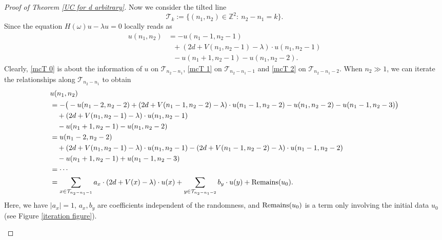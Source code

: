 \documentclass[11pt,reqno,UTF8,twoside]{amsart}
\newcommand{\Z}{\mathbb{Z}}
\newcommand{\mcT}{\mathcal{T}}
\theoremstyle{definition}
\numberwithin{equation}{section}
\begin{document}
\begin{proof}[Proof of Theorem \ref{UC for d arbitrary}]
Now we consider the tilted line 
\[\mcT_k:=  \{(n_1,n_2)\in \Z^2 : \ n_2-n_1  = k \}.\]
Since the  equation $H(\omega) u-\lambda u=0 $ locally reads  as 
\begin{align}
\label{mcT 0}  u(n_1,n_2) &= -u(n_1-1,n_2-1)\\
 \label{mcT 1}   &\ \ \ + (2d+V(n_1,n_2-1)-\lambda)\cdot u(n_1,n_2-1) \\
  \label{mcT 2}  &\ \ \ -u(n_1+1,n_2-1)-u(n_1,n_2-2).
\end{align}
Clearly, \eqref{mcT 0} is about the information of $u$ on $\mcT_{n_2-n_1}$,  \eqref{mcT 1} on $\mcT_{n_2-n_1-1}$ and \eqref{mcT 2}  on $\mcT_{n_2-n_1-2}$. When $n_2\gg 1$, we can iterate the relationships along $\mcT_{n_2-n_1}$ to obtain 
{\Small
\begin{align*}
  &u(n_1,n_2) \\
  &= -\big(-u(n_1-2,n_2-2) + (2d+V(n_1-1,n_2-2)-\lambda)\cdot u(n_1-1,n_2-2) -u(n_1,n_2-2)-u(n_1-1,n_2-3) \big)\\
   &\quad + (2d+V(n_1,n_2-1)-\lambda)\cdot u(n_1,n_2-1) \\
   &\quad -u(n_1+1,n_2-1)-u(n_1,n_2-2)\\
   &=u(n_1-2,n_2-2 ) \\
   &\quad +(2d+V(n_1,n_2-1)-\lambda)\cdot u(n_1,n_2-1) - (2d+V(n_1-1,n_2-2)-\lambda)\cdot u(n_1-1,n_2-2) \\
  &\quad -u(n_1+1,n_2-1)+u(n_1-1,n_2-3) \\
  &=\cdots \\
  &=\sum_{x\in \mcT_{n_2-n_1-1}} a_x \cdot (2d+V(x)-\lambda) \cdot u(x)  +\sum_{y\in \mcT_{n_2-n_1-2}} b_y \cdot u(y) + {\rm Remains}(u_0).
\end{align*}
}
Here, we have $|a_x|=1$, $a_x,b_y$ are  coefficients independent of the randomness, and ${\rm Remains}(u_0)$ is a term only involving the initial data $u_0$  (see Figure  \ref{iteration figure}). 



\begin{figure}[htbp]
  
\centering




\begin{tikzpicture}[x=0.75pt,y=0.75pt,yscale=-0.8,xscale=0.8]


\end{tikzpicture}
\end{figure}
\end{proof}
\end{document}
